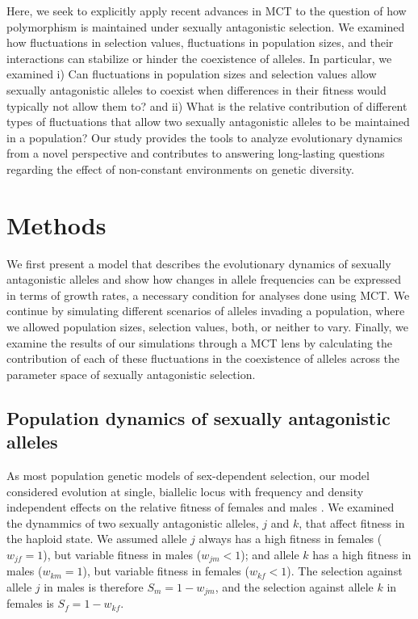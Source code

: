 \documentclass[12pt]{article}
\newcommand{\ACL}[1]{\authornote{ACL: #1}}
\begin{document}
Here, we seek to explicitly apply recent  advances in MCT to the question of how
polymorphism is maintained under sexually antagonistic selection.  We examined how fluctuations in selection values, fluctuations in population sizes, and their interactions can stabilize or hinder the coexistence of alleles. In particular, we examined  i) Can fluctuations in population sizes and selection values allow sexually antagonistic alleles to coexist when differences in their fitness would typically not allow them to? and ii) What is the relative contribution of different types of fluctuations that allow two sexually antagonistic alleles to be maintained in a population? Our study provides the tools to analyze evolutionary dynamics from a novel perspective and contributes to answering long-lasting questions regarding the effect of non-constant environments on genetic diversity.



\section{Methods}

We first present  a model that describes the evolutionary dynamics of sexually antagonistic alleles and show how changes in allele frequencies can be expressed in terms of growth rates, a necessary condition for analyses done using MCT. We continue by simulating different scenarios of alleles invading a population, where we allowed population sizes, selection values, both, or neither to vary. Finally, we examine the results of our simulations through a MCT lens by calculating the contribution of each of these fluctuations in the coexistence of alleles across the parameter space of sexually antagonistic selection.


\subsection*{Population dynamics of sexually antagonistic alleles}

 As most population genetic models of sex-dependent selection, our model considered evolution at single, biallelic  locus with frequency and density independent effects on the relative fitness of females and males \citep{wright1942statistical,kidwell1977regions, immler2012ploidally}\ACL{Add more recent refs, sarahs suggestions and e.g.,}. We examined the dynammics of two  sexually antagonistic alleles, $j$ and $k$, that affect fitness in the haploid state. We assumed allele $j$ always has a high fitness in females ($w_{jf} = 1$), but variable fitness in males ($w_{jm} < 1$); and allele $k$ has a high fitness in males ($w_{km} = 1$), but variable fitness in females ($w_{kf} < 1 $). The selection against allele $j$ in males is therefore $S_{m}= 1 - w_{jm}$, and the selection against allele $k$ in females is $S_{f}= 1 - w_{kf}$.
\end{document}
